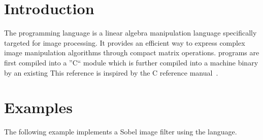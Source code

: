 \newcommand{\startsyn}{\begin{center}\begin{tabular}{l}}
\newcommand{\stopsyn}{\end{tabular}\end{center}}

\section{Introduction}
The \sys{} programming language is a linear algebra manipulation language
specifically targeted for image processing. It provides an efficient way to
express complex image manipulation algorithms through compact matrix
operations. \sys{} programs are first compiled into a ''C`` module which is
further compiled into a machine binary by an existing 
This reference is inspired by the C reference manual~\cite{DBLP:books/ph/KernighanR88}.









\section{Examples}
The following example implements a Sobel image filter using the
\sys{} language.

